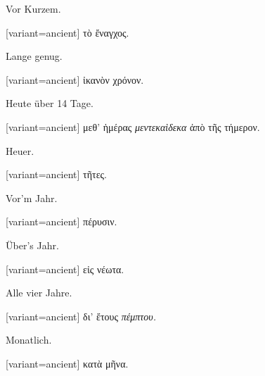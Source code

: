 Vor Kurzem.

\switchcolumn

\begin{greek}[variant=ancient]%
τὸ ἔναγχος.

\end{greek}%
\switchcolumn*

Lange genug.

\switchcolumn

\begin{greek}[variant=ancient]%
ἰκανὸν χρόνον.

\end{greek}%
\switchcolumn*

Heute über 14 Tage.

\switchcolumn

\begin{greek}[variant=ancient]%
μεθ' ἡμέρας \emph{μεντεκαὶδεκα} ἀπὸ τῆς τήμερον.

\end{greek}%
\switchcolumn*

Heuer.

\switchcolumn

\begin{greek}[variant=ancient]%
τῆτες.

\end{greek}%
\switchcolumn*

Vor'm Jahr.

\switchcolumn

\begin{greek}[variant=ancient]%
πέρυσιν.

\end{greek}%
\switchcolumn*

Über's Jahr.

\switchcolumn

\begin{greek}[variant=ancient]%
εἰς νέωτα.

\end{greek}%
\switchcolumn*

Alle vier Jahre.

\switchcolumn

\begin{greek}[variant=ancient]%
δι' ἔτους \emph{πέμπτου.}

\end{greek}%
\switchcolumn*

Monatlich.

\switchcolumn

\begin{greek}[variant=ancient]%
κατὰ μῆνα.

\end{greek}%
\switchcolumn*

